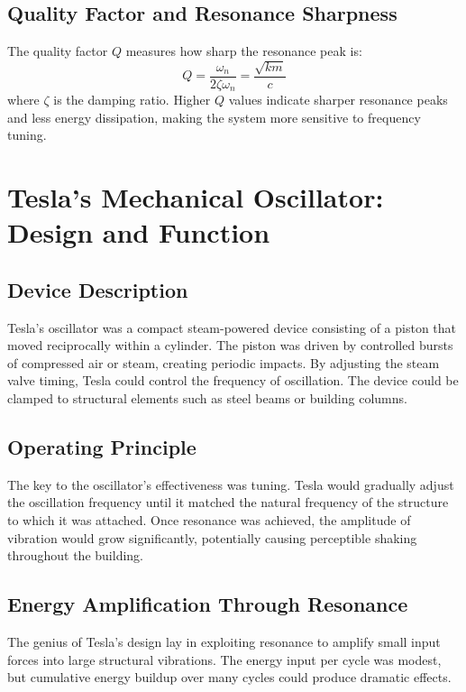\documentclass[12pt,a4paper]{article}
\begin{document}
\subsection*{Quality Factor and Resonance Sharpness}
The quality factor $Q$ measures how sharp the resonance peak is:
\begin{equation}
Q = \frac{\omega_n}{2\zeta\omega_n} = \frac{\sqrt{km}}{c}
\end{equation}
where $\zeta$ is the damping ratio. Higher $Q$ values indicate sharper resonance peaks and less energy dissipation, making the system more sensitive to frequency tuning.

\section*{Tesla's Mechanical Oscillator: Design and Function}

\subsection*{Device Description}
Tesla's oscillator was a compact steam-powered device consisting of a piston that moved reciprocally within a cylinder. The piston was driven by controlled bursts of compressed air or steam, creating periodic impacts. By adjusting the steam valve timing, Tesla could control the frequency of oscillation. The device could be clamped to structural elements such as steel beams or building columns.

\subsection*{Operating Principle}
The key to the oscillator's effectiveness was tuning. Tesla would gradually adjust the oscillation frequency until it matched the natural frequency of the structure to which it was attached. Once resonance was achieved, the amplitude of vibration would grow significantly, potentially causing perceptible shaking throughout the building.

\subsection*{Energy Amplification Through Resonance}
The genius of Tesla's design lay in exploiting resonance to amplify small input forces into large structural vibrations. The energy input per cycle was modest, but cumulative energy buildup over many cycles could produce dramatic effects.
\end{document}
